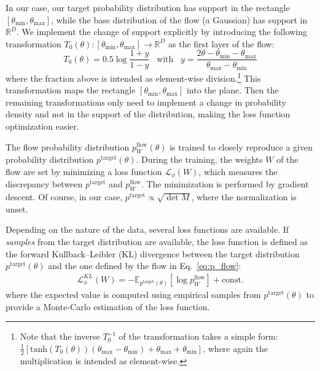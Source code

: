 \documentclass[twocolumn,showpacs,preprintnumbers,nofootinbib,prd,
superscriptaddress,10pt]{revtex4-2}
\begin{document}
In our case, our target probability distribution has support in the rectangle $[\theta_\text{min}, \theta_\text{max}]$, while the base distribution of the flow (a Gaussian) has support in $\mathbb{R}^D$. We implement the change of support explicitly by introducing the following transformation $T_0(\theta): [\theta_\text{min}, \theta_\text{max}] \to \mathbb{R}^D$ as the first layer of the flow:
%
\begin{equation}\label{eq:first_transform}
	T_0(\theta) = 0.5 \log \frac{1 + y}{1 - y} \;\;\; \text{with} \;\;\; y = \frac{2\theta - \theta_\text{min} - \theta_\text{max}}{\theta_\text{max}- \theta_\text{min}}
\end{equation}
where the fraction above is intended as element-wise division.\footnote{
Note that the inverse $T_0^{-1}$ of the transformation takes a simple form: $\frac{1}{2} [\text{tanh}(T_0(\theta))(\theta_\text{max} - \theta_\text{min})+\theta_\text{max}+ \theta_\text{min}]$, where again the multiplication is intended as element-wise.
}
This transformation maps the rectangle $[\theta_\text{min}, \theta_\text{max}]$ into the plane. Then the remaining transformations only need to implement a change in probability density and not in the support of the distribution, making the loss function optimization easier.

The flow probability distribution $p^\text{flow}_W(\theta)$ is trained to closely reproduce a given probability distribution $p^\text{target}(\theta)$.
During the training, the weights $W$ of the flow are set by minimizing a loss function $\mathcal{L}_\phi(W)$, which measures the discrepancy between $p^\text{target}$ and $p^\text{flow}_W$. The minimization is performed by gradient descent.
Of course, in our case, $p^\text{target} \propto \sqrt{\det M}$, where the normalization is unset.

Depending on the nature of the data, several loss functions are available.
If {\it samples} from the target distribution are available, the loss function is defined as the forward Kullback–Leibler (KL) divergence between the target distribution $p^\text{target}(\theta)$ and the one defined by the flow in Eq.~\eqref{eq:p_flow}:
\begin{align}
	\mathcal{L}^{KL}_\phi(W) = - \mathbb{E}_{p^\text{target}(\theta)} [\log p^\text{flow}_W] + \text{const.}
\end{align}
where the expected value is computed using empirical samples from $p^\text{target}(\theta)$ to provide a Monte-Carlo estimation of the loss function.
\end{document}
